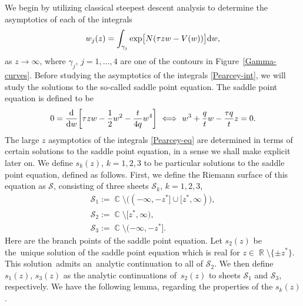 \documentclass[10pt,a4paper]{amsart}
\DeclareMathOperator{\CC}{\mathbb{C}}
\DeclareMathOperator{\RR}{\mathbb{R}}
\numberwithin{equation}{section}
\begin{document}
We begin by utilizing classical steepest descent analysis to determine the asymptotics of each of the integrals
 \begin{equation}\label{Pearcey-int}
 w_j(z) = \int_{\gamma_j} \exp\bigl[ N(\tau z w - V(w) )\bigr] {\rm d}w,
 \end{equation}
as $z \to \infty$, where $\gamma_j$, $j = 1,\dots,4$ are one of the contours in Figure~\ref{Gamma-curves}. Before studying the asymptotics of the integrals \eqref{Pearcey-int}, we will study the solutions to the so-called saddle point equation. The saddle point equation is defined to be
 \begin{equation*}
 0 = \frac{\rm d}{{\rm d}w}\biggl[\tau z w -\frac{1}{2}w^2 -\frac{t}{4q}w^4\biggr] \ \Longleftrightarrow\ w^3 + \frac{q}{t}w -\frac{\tau q}{t}z = 0.
 \end{equation*}
The large $z$ asymptotics of the integrals \eqref{Pearcey-eq} are determined in terms of certain solutions to the saddle point equation, in a sense we shall make explicit later on.
We define $s_k(z)$, $k=1,2,3$ to be particular solutions to the saddle point equation, defined as follows. First, we define the Riemann surface of this equation
as $\mathcal{S}$, consisting of three sheets $\mathcal{S}_k$, $k=1,2,3$,
\begin{gather*}
 \mathcal{S}_{1} := \CC \setminus \bigl((-\infty,-z^*] \cup [z^*,\infty)\bigr),\\%
 \mathcal{S}_{2} := \CC \setminus [z^*,\infty),\\%
 \mathcal{S}_{3} := \CC \setminus (-\infty,-z^*].%
\end{gather*}
Here  are the branch points of the saddle point equation.
Let $s_2(z)$ be the~unique solution of the saddle point equation which is real for $z\in \RR \setminus\{\pm z^*\}$. This solution~admits an~analytic continuation to all of $\mathcal{S}_2$. We then define $s_1(z)$, $s_3(z)$ as the analytic continuations of~$s_2(z)$ to sheets $\mathcal{S}_1$ and $\mathcal{S}_3$, respectively.
We have the following lemma, regarding the properties of the $s_k(z)$.
\end{document}
